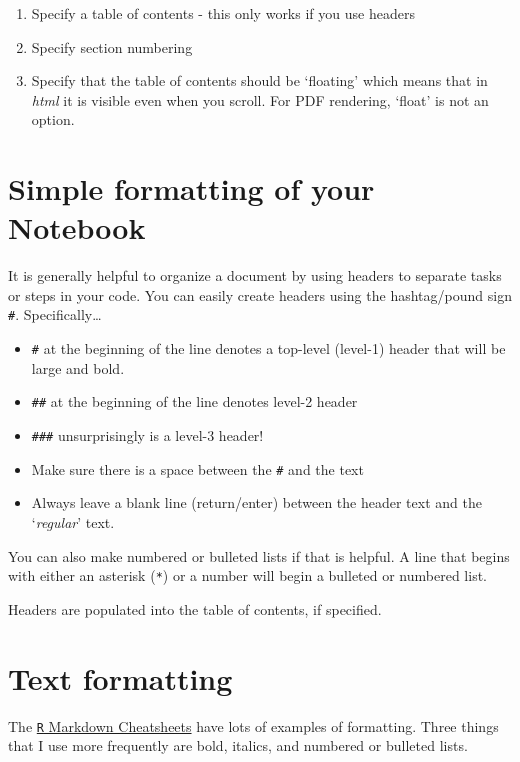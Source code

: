 \documentclass[
]{book}
\providecommand{\tightlist}{%
  \setlength{\itemsep}{0pt}\setlength{\parskip}{0pt}}
\begin{document}
\begin{enumerate}
\def\labelenumi{\arabic{enumi}.}
\tightlist
\item
  Specify a table of contents - this only works if you use headers
\item
  Specify section numbering
\item
  Specify that the table of contents should be `floating' which means that in \emph{html} it is visible even when you scroll. For PDF rendering, `float' is not an option.
\end{enumerate}

\hypertarget{simple-formatting-of-your-notebook}{%
\section{Simple formatting of your Notebook}\label{simple-formatting-of-your-notebook}}

It is generally helpful to organize a document by using headers to separate tasks or steps in your code. You can easily create headers using the hashtag/pound sign \texttt{\#}. Specifically\ldots{}

\begin{itemize}
\tightlist
\item
  \texttt{\#} at the beginning of the line denotes a top-level (level-1) header that will be large and bold.
\item
  \texttt{\#\#} at the beginning of the line denotes level-2 header
\item
  \texttt{\#\#\#} unsurprisingly is a level-3 header!
\item
  Make sure there is a space between the \texttt{\#} and the text
\item
  Always leave a blank line (return/enter) between the header text and the `\emph{regular}' text.
\end{itemize}

You can also make numbered or bulleted lists if that is helpful. A line that begins with either an asterisk (\texttt{*}) or a number will begin a bulleted or numbered list.

Headers are populated into the table of contents, if specified.

\hypertarget{text-formatting}{%
\section{Text formatting}\label{text-formatting}}

The \href{https://github.com/rstudio/cheatsheets/raw/master/rmarkdown.pdf}{\texttt{R} Markdown Cheatsheets} have lots of examples of formatting. Three things that I use more frequently are bold, italics, and numbered or bulleted lists.
\end{document}
